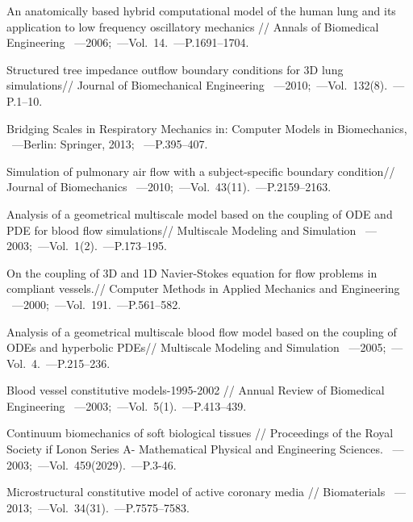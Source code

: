 \begin{thebibliography}{}
     An anatomically based hybrid computational model of the human lung and its application to low
frequency oscillatory mechanics // Annals of Biomedical Engineering ~---2006;~---Vol.~14.~---P.1691–1704.

     Structured tree impedance outflow boundary conditions for 3D lung simulations// Journal of Biomechanical Engineering ~---2010;~---Vol.~132(8).~---P.1–10.
    
     Bridging Scales in Respiratory Mechanics in: Computer Models in Biomechanics, ~---Berlin:  Springer, 2013; ~---P.395–407.
    
     Simulation of pulmonary air flow with a subject-specific boundary
condition// Journal of Biomechanics ~---2010;~---Vol.~43(11).~---P.2159–2163.

     Analysis of a geometrical multiscale model based on the coupling of ODE and PDE for
blood flow simulations// Multiscale Modeling and Simulation ~---2003;~---Vol.~1(2).~---P.173–195.

     On the coupling of 3D and 1D Navier-Stokes equation
for flow problems in compliant vessels.// Computer Methods in Applied Mechanics and Engineering ~---2000;~---Vol.~191.~---P.561–582.

     Analysis of a geometrical multiscale blood flow model based on the coupling
of ODEs and hyperbolic PDEs// Multiscale Modeling and Simulation ~---2005;~---Vol.~4.~---P.215–236.

     Blood vessel constitutive models-1995-2002 // Annual Review of Biomedical Engineering ~---2003;~---Vol.~5(1).~---P.413–439.
    
     Continuum biomechanics of soft biological tissues  // Proceedings of the Royal Society if Lonon Series A- Mathematical Physical and Engineering Sciences. ~---2003;~---Vol.~459(2029).~---P.3-46.
    
     Microstructural constitutive model of active coronary media  // Biomaterials ~---2013;~---Vol.~34(31).~---P.7575–7583.
    

\end{thebibliography}
